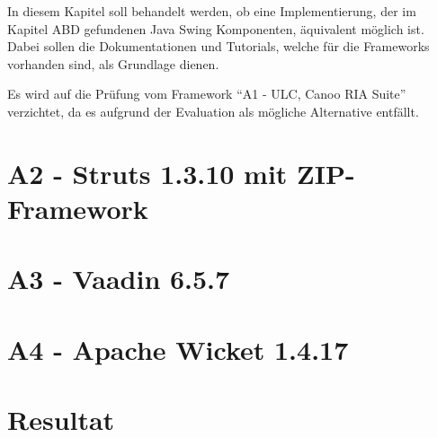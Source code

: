 In diesem Kapitel soll behandelt werden, ob eine Implementierung, der im Kapitel
ABD gefundenen Java Swing Komponenten, äquivalent möglich ist. Dabei sollen die
Dokumentationen und Tutorials, welche für die Frameworks vorhanden sind, als
Grundlage dienen.

Es wird auf die Prüfung vom Framework ``A1 - ULC, Canoo RIA Suite'' verzichtet,
da es aufgrund der Evaluation als mögliche Alternative entfällt.

\section{A2 - Struts 1.3.10 mit ZIP-Framework}

\section{A3 - Vaadin 6.5.7}

\section{A4 - Apache Wicket 1.4.17}

\section{Resultat}